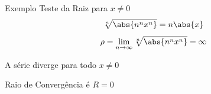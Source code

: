 \begin{frame}{Exemplo \theexemplo}
  Teste da Raiz para \(x\neq 0\)
  \pause
  \[
    \sqrt[n]{\abs{n^nx^n}} =
    n\abs{x}
  \]
  \pause
  \vspace{-\baselineskip}
  \[
    \rho = \lim_{n\to\infty} \sqrt[n]{\abs{n^nx^n}} = \infty
  \]

  \pause
  \vspace{0.7\baselineskip}
  A série diverge para todo \(x\neq 0\)

  \pause
  \vspace{0.5\baselineskip}
  Raio de Convergência é $R=0$
\end{frame}

\begin{frame}{\contentsname}
  \tableofcontents
\end{frame}



